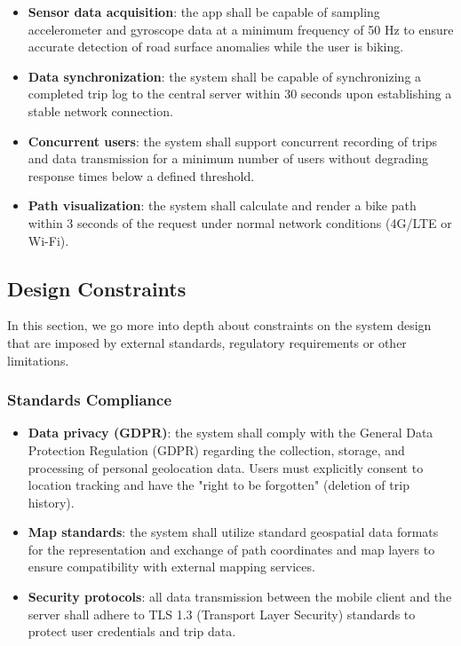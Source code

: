 \documentclass{article}
\begin{document}
\begin{itemize}
    \item \textbf{Sensor data acquisition}: the app shall be capable of sampling accelerometer and gyroscope data at a minimum frequency of 50 Hz to ensure accurate detection of road surface anomalies while the user is biking.
    \item \textbf{Data synchronization}: the system shall be capable of synchronizing a completed trip log to the central server within 30 seconds upon establishing a stable network connection.
    \item \textbf{Concurrent users}: the system shall support concurrent recording of trips and data transmission for a minimum number of users without degrading response times below a defined threshold.
    \item \textbf{Path visualization}: the system shall calculate and render a bike path within 3 seconds of the request under normal network conditions (4G/LTE or Wi-Fi).
\end{itemize}

\subsection{Design Constraints}
In this section, we go more into depth about constraints on the system design that are imposed by external standards, regulatory requirements or other limitations.
\subsubsection{Standards Compliance}
\begin{itemize}
    \item \textbf{Data privacy (GDPR)}: the system shall comply with the General Data Protection Regulation (GDPR) regarding the collection, storage, and processing of personal geolocation data. Users must explicitly consent to location tracking and have the "right to be forgotten" (deletion of trip history).
    \item \textbf{Map standards}: the system shall utilize standard geospatial data formats for the representation and exchange of path coordinates and map layers to ensure compatibility with external mapping services.
    \item \textbf{Security protocols}: all data transmission between the mobile client and the server shall adhere to TLS 1.3 (Transport Layer Security) standards to protect user credentials and trip data.
\end{itemize}
\end{document}
